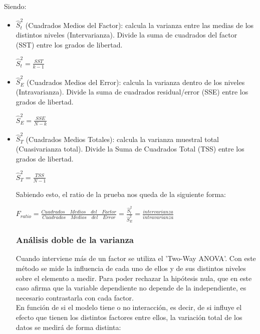 Siendo:
\begin{itemize}
	\item $\hat{S}_{t}^{2}$ (Cuadrados Medios del Factor): calcula la varianza entre las medias de los distintos niveles (Intervarianza). Divide la suma de cuadrados del factor (SST) entre los grados de libertad.
	\begin{center}
		$\hat{S}_{t}^{2} = \frac{SST}{k-1}$
	\end{center}
	\item $\hat{S}_{E}^{2}$ (Cuadrados Medios del Error): calcula la varianza dentro de los niveles (Intravarianza). Divide la suma de cuadrados residual/error (SSE) entre los grados de libertad.
	\begin{center}
		$\hat{S}_{E}^{2} = \frac{SSE}{N-k}$
	\end{center}
	\item $\hat{S}_{T}^{2}$ (Cuadrados Medios Totales): calcula la varianza muestral total (Cuasivarianza total). Divide la Suma de Cuadrados Total (TSS) entre los grados de libertad.
	\begin{center}
		$\hat{S}_{T}^{2} = \frac{TSS}{N-1}$
	\end{center}
	
	
	Sabiendo esto, el ratio de la prueba nos queda de la siguiente forma:
	\begin{center}
	$F_{ratio}=\frac{Cuadrados\quad Medios\quad del\quad Factor}{Cuadrados\quad Medios\quad del\quad Error}=\frac{\hat{S}_{t}^{2}}{\hat{S}_{E}^{2}}=\frac{intervarianza}{intravarianza}$
	\end{center}





\subsubsection{Análisis doble de la varianza}
Cuando interviene más de un factor se utiliza el 'Two-Way ANOVA'. Con este método se mide la influencia de cada uno de ellos y de sus distintos niveles sobre el elemento a medir. Para poder rechazar la hipótesis nula, que en este caso afirma que la variable dependiente no depende de la independiente, es necesario contrastarla con cada factor.\\	


En función de si el modelo tiene o no interacción, es decir, de si influye el efecto que tienen los distintos factores entre ellos, la variación total de los datos se medirá de forma distinta:


\end{itemize}
